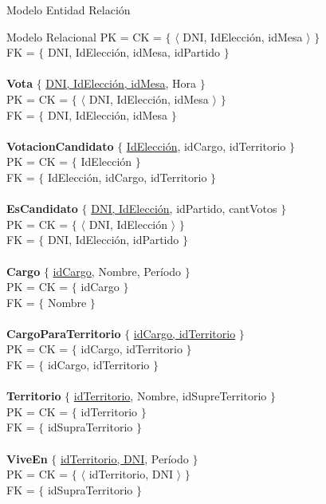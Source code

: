 \begin{section}{Modelo Entidad Relaci\'on}
\begin{subsection}{Modelo Relacional}
PK = CK = $ \lbrace $ $ \langle $ DNI, IdElecci\'on, idMesa $ \rangle $ $ \rbrace $ \\
FK = $ \lbrace $ DNI, IdElecci\'on, idMesa, idPartido $ \rbrace $\\
\\
\textbf{Vota} $ \lbrace $ \underline{DNI, IdElecci\'on, idMesa}, Hora $ \rbrace $ \\
PK = CK = $ \lbrace $ $ \langle $ DNI, IdElecci\'on, idMesa $ \rangle $ $ \rbrace $ \\
FK = $ \lbrace $ DNI, IdElecci\'on, idMesa $ \rbrace $\\
\\
\textbf{VotacionCandidato} $ \lbrace $ \underline{IdElecci\'on}, idCargo, idTerritorio $ \rbrace $ \\
PK = CK = $ \lbrace $ IdElecci\'on $ \rbrace $ \\
FK = $ \lbrace $ IdElecci\'on, idCargo, idTerritorio $ \rbrace $\\
\\
\textbf{EsCandidato} $ \lbrace $ \underline{DNI, IdElecci\'on}, idPartido, cantVotos $ \rbrace $ \\
PK = CK = $ \lbrace $ $ \langle $ DNI, IdElecci\'on $ \rangle $ $ \rbrace $ \\
FK = $ \lbrace $ DNI, IdElecci\'on, idPartido $ \rbrace $\\
\\
\textbf{Cargo} $ \lbrace $ \underline{idCargo}, Nombre, Período $ \rbrace $ \\
PK = CK = $ \lbrace $ idCargo $ \rbrace $ \\
FK = $ \lbrace $ Nombre $ \rbrace $\\
\\
\textbf{CargoParaTerritorio} $ \lbrace $ \underline{idCargo, idTerritorio} $ \rbrace $ \\
PK = CK = $ \lbrace $ idCargo, idTerritorio $ \rbrace $ \\
FK = $ \lbrace $ idCargo, idTerritorio $ \rbrace $\\
\\
\textbf{Territorio} $ \lbrace $ \underline{idTerritorio}, Nombre, idSupreTerritorio $ \rbrace $ \\
PK = CK = $ \lbrace $ idTerritorio $ \rbrace $ \\
FK = $ \lbrace $ idSupraTerritorio $ \rbrace $\\
\\
\textbf{ViveEn} $ \lbrace $ \underline{idTerritorio, DNI}, Per\'iodo $ \rbrace $ \\
PK = CK = $ \lbrace $ $ \langle $ idTerritorio, DNI $ \rangle $ $ \rbrace $ \\
FK = $ \lbrace $ idSupraTerritorio $ \rbrace $\\


\end{subsection}

\end{section}
